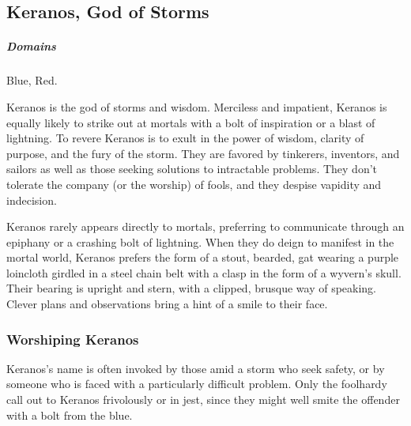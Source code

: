 %

\subsection*{Keranos, God of Storms} \label{ssec::keranos}
    \subparagraph{Domains} Blue, Red.

    Keranos is the god of storms and wisdom.
    Merciless and impatient, Keranos is equally likely to strike out at mortals with a bolt of inspiration or a blast of lightning.
    To revere Keranos is to exult in the power of wisdom, clarity of purpose, and the fury of the storm.
    They are favored by tinkerers, inventors, and sailors as well as those seeking solutions to intractable problems.
    They don't tolerate the company (or the worship) of fools, and they despise vapidity and indecision.

    Keranos rarely appears directly to mortals, preferring to communicate through an epiphany or a crashing bolt of lightning.
    When they do deign to manifest in the mortal world, Keranos prefers the form of a stout, bearded, gat wearing a purple loincloth girdled in a steel chain belt with a clasp in the form of a wyvern's skull.
    Their bearing is upright and stern, with a clipped, brusque way of speaking.
    Clever plans and observations bring a hint of a smile to their face.



    \subsubsection{Worshiping Keranos}
        Keranos's name is often invoked by those amid a storm who seek safety, or by someone who is faced with a particularly difficult problem.
        Only the foolhardy call out to Keranos frivolously or in jest, since they might well smite the offender with a bolt from the blue.

